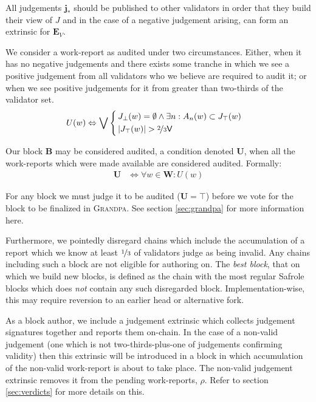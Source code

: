 All judgements $\mathbf{j}_*$ should be published to other validators in order that they build their view of $J$ and in the case of a negative judgement arising, can form an extrinsic for $\mathbf{E}_V$.

We consider a work-report as audited under two circumstances. Either, when it has no negative judgements and there exists some tranche in which we see a positive judgement from all validators who we believe are required to audit it; or when we see positive judgements for it from greater than two-thirds of the validator set.
\begin{align}
  U(w) &\Leftrightarrow \bigvee\,\left\{\,\begin{aligned}
      &J_\bot(w) = \emptyset \wedge \exists n : A_n(w) \subset J_\top(w) \\
      &|J_\top(w)| > \nicefrac{2}{3}\mathsf{V}
  \end{aligned}\right.
\end{align}

Our block $\mathbf{B}$ may be considered audited, a condition denoted $\mathbf{U}$, when all the work-reports which were made available are considered audited. Formally:
\begin{align}
  \mathbf{U} &\Leftrightarrow \forall w \in \mathbf{W} : U(w)
\end{align}

For any block we must judge it to be audited (\ie $\mathbf{U} = \top$) before we vote for the block to be finalized in \textsc{Grandpa}. See section \ref{sec:grandpa} for more information here.

Furthermore, we pointedly disregard chains which include the accumulation of a report which we know at least $\nicefrac{1}{3}$ of validators judge as being invalid. Any chains including such a block are not eligible for authoring on. The \emph{best block}, \ie that on which we build new blocks, is defined as the chain with the most regular Safrole blocks which does \emph{not} contain any such disregarded block. Implementation-wise, this may require reversion to an earlier head or alternative fork.

As a block author, we include a judgement extrinsic which collects judgement signatures together and reports them on-chain. In the case of a non-valid judgement (\ie one which is not two-thirds-plus-one of judgements confirming validity) then this extrinsic will be introduced in a block in which accumulation of the non-valid work-report is about to take place. The non-valid judgement extrinsic removes it from the pending work-reports, $\rho$. Refer to section \ref{sec:verdicts} for more details on this.

